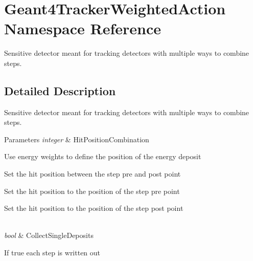 \hypertarget{namespace_geant4_tracker_weighted_action}{}\section{Geant4\+Tracker\+Weighted\+Action Namespace Reference}
\label{namespace_geant4_tracker_weighted_action}


Sensitive detector meant for tracking detectors with multiple ways to combine steps.  




\subsection{Detailed Description}
Sensitive detector meant for tracking detectors with multiple ways to combine steps. 


\begin{DoxyParams}{Parameters}
{\em integer} & Hit\+Position\+Combination
\begin{DoxyEnumerate}
\item Use energy weights to define the position of the energy deposit
\item Set the hit position between the step pre and post point
\item Set the hit position to the position of the step pre point
\item Set the hit position to the position of the step post point
\end{DoxyEnumerate}\\
\hline
{\em bool} & Collect\+Single\+Deposits
\begin{DoxyItemize}
\item If true each step is written out 
\end{DoxyItemize}\\
\hline
\end{DoxyParams}
